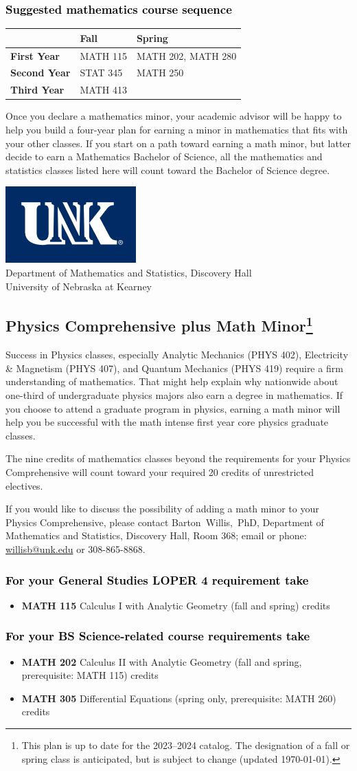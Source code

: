 \documentclass[10pt]{article}
\makeatletter
\newcommand{\calcone}{\textbf{MATH 115} Calculus I with Analytic Geometry (fall and spring) \dotfill 5 credits}
\newcommand{\calconeshort}{MATH 115}
\newcommand{\calctwo}{\textbf{MATH 202} Calculus II with Analytic Geometry (fall and spring, prerequisite: MATH 115) \dotfill 5 credits }
\newcommand{\calctwoshort}{MATH 202}
\newcommand{\foundationsshort}{MATH 250}
\newcommand{\linearshort}{MATH 280}
\newcommand{\discreteshort}{MATH 413}
\newcommand{\diffeq}{\textbf{MATH 305}	Differential Equations (spring only, prerequisite: MATH 260) \dotfill 	3 credits}
\newcommand{\appliedstatshort}{STAT 345}
\newcommand{\contactbw}{\mbox{Barton Willis, PhD}, Department of Mathematics and Statistics,  Discovery Hall, Room 368;
email or phone: \href{mailto:willisb@unk.edu}{willisb@unk.edu} or 308-865-8868.}
\newcommand{\forinfo}[2]{If you would like to discuss the possibility of adding a math {#1} to your {#2}, please contact \contactbw}
\newcommand{\catalog}{2023--2024 }
\newcommand{\LOPER}{LOPER\xspace}
\newcommand{\myfootnote}{\footnote{This plan is up to date for  the \catalog catalog. The designation of a fall or spring class is 
anticipated, but  is subject to change (updated \today).}}
\newcommand{\myheading}{
\begin{flushleft}
\includegraphics[scale=0.35]{unk-logo}\\
\setcounter{footnote}{0}
\vspace{0.25in}
 \textcolor{unkblue}{Department of Mathematics and Statistics, Discovery Hall} \\
  \textcolor{unkblue}{University of Nebraska at Kearney}
\end{flushleft}}
\newcommand{\mathminor}{
  \begin{center}
   \begin{tabular}[h]{| l | l | l|} 
      \hline
      & \textbf{Fall}         &  \textbf{Spring}  \\ \hline 
      \textbf{First Year} & \calconeshort & \calctwoshort, \linearshort \\  \hline
      \textbf{Second Year} &  \appliedstatshort{} &  \foundationsshort \\ \hline
      \textbf{Third Year} &    \discreteshort              &  \\ \hline
      \end{tabular}
      \end{center}}
\makeatother
\begin{document}
\vspace{-0.1in}
\subsubsection*{\textcolor{black}{Suggested mathematics course sequence}}

\mathminor

\vspace{0.1in}
\noindent Once you declare a mathematics minor, your academic advisor 
will be happy to help you build a four-year plan for earning a minor 
in mathematics that fits with your other classes.  If you start on 
a path toward earning a math minor, but latter decide to earn a  
Mathematics Bachelor of Science, all the mathematics and statistics  
classes listed here will count toward the Bachelor of Science degree.


\newpage

\myheading


\subsection*{\textbf{\textcolor{unkblue}{Physics Comprehensive plus Math Minor\myfootnote}}}

\noindent Success in Physics classes, especially  Analytic Mechanics (PHYS 402), Electricity \& Magnetism (PHYS 407), and Quantum Mechanics (PHYS 419) require a firm understanding of mathematics. That might help explain why nationwide about one-third of undergraduate physics majors also earn a degree in mathematics. If you choose to attend a graduate program in physics, earning a math minor will help you be successful with the math intense first year core physics graduate classes.

The nine credits of mathematics classes beyond the requirements for your Physics Comprehensive will count toward your required 20 credits of unrestricted electives.


\forinfo{minor}{Physics Comprehensive}

\subsubsection*{\textcolor{black}{For your General Studies \LOPER 4 requirement take}}
\begin{itemize}
\item \calcone
\end{itemize}

\subsubsection*{\textcolor{black}{For your BS Science-related course requirements take}}
\begin{itemize}
\item \calctwo
\item \diffeq
\end{itemize}
\end{document}

